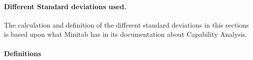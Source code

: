 \documentclass[11pt]{article}
\begin{document}
\hypertarget{different-standard-deviations.}{%
\paragraph{Different Standard deviations used.}\label{different-standard-deviations.}}

The calculation and definition of the different standard deviations in
this sections is based upon what Minitab has in its documentation about
Capability Analysis.

\hypertarget{definitions}{%
\paragraph{Definitions}\label{definitions}}

\begin{center}
  

\end{center}
\end{document}
